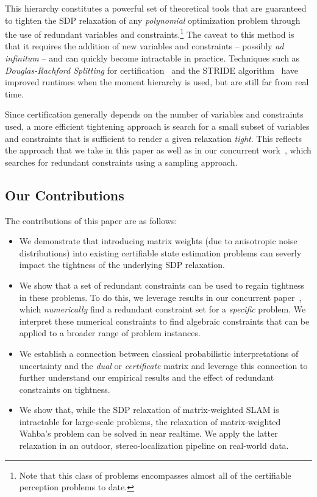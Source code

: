 \documentclass[lettersize,journal]{IEEEtran}
\begin{document}
This hierarchy constitutes a powerful set of theoretical tools that are guaranteed to tighten the SDP relaxation of any \emph{polynomial} optimization problem through the use of redundant variables and constraints.\footnote{Note that this class of problems encompasses almost all of the certifiable perception problems to date.} The caveat to this method is that it requires the addition of new variables and constraints -- possibly \emph{ad infinitum} -- and can quickly become intractable in practice. Techniques such as \emph{Douglas-Rachford Splitting} for certification~\cite{yangTEASERFastCertifiable2021} and the STRIDE algorithm~\cite{yangCertifiablyOptimalOutlierRobust2023} have improved runtimes when the moment hierarchy is used, but are still far from real time. 

Since certification generally depends on the number of variables and constraints used, a more efficient tightening approach is search for a small  subset of variables and constraints that is sufficient  to render  a given relaxation \emph{tight}. This reflects the approach that we take in this paper as well as in our concurrent work~\cite{dumbgenGloballyOptimalState2023a}, which searches for redundant constraints using a sampling approach.

\subsection{Our Contributions}

The contributions of this paper are as follows:
\begin{itemize}
	\item We demonstrate that introducing matrix weights (due to anisotropic noise distributions) into existing certifiable state estimation problems can severly impact the tightness of the underlying SDP relaxation.
	\item We show that a set of redundant constraints can be used to regain tightness in these problems. To do this, we leverage results in our concurrent paper~\cite{dumbgenGloballyOptimalState2023a}, which \emph{numerically} find a redundant constraint set for a \emph{specific} problem. We interpret these numerical constraints to find algebraic constraints that can be applied to a broader range of problem instances.
	\item We establish a connection between classical probabilistic interpretations of uncertainty and the \emph{dual} or \emph{certificate} matrix and leverage this connection to further understand our empirical results and the effect of redundant constraints on tightness.
	\item We show that, while the SDP relaxation of matrix-weighted SLAM is intractable for large-scale problems, the relaxation of matrix-weighted Wahba's problem can be solved in near realtime. We apply the latter relaxation in an outdoor, stereo-localization pipeline on real-world data.
\end{itemize}
\end{document}
